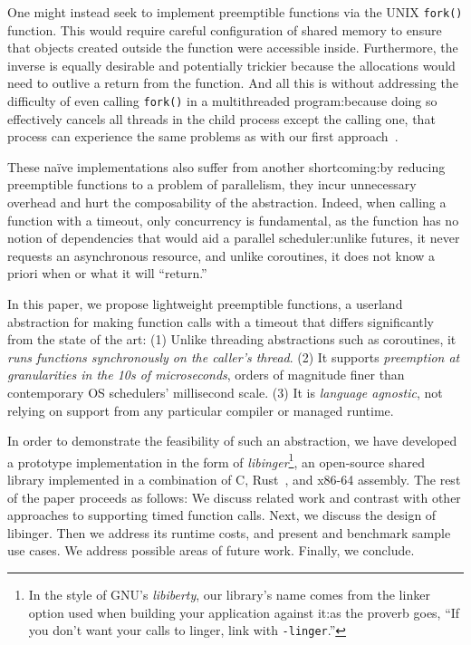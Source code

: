 One might instead seek to implement preemptible functions via the UNIX
\texttt{fork()} function.  This would require careful configuration of shared memory
to ensure that objects created outside the function were accessible inside.
Furthermore, the inverse is equally desirable and potentially trickier because the
allocations would need to outlive a return from the function.  And all this is
without addressing the difficulty of even calling \texttt{fork()} in a multithreaded
program:\@ because doing so effectively cancels all threads in the child process
except the calling one, that process can experience the same problems as with our
first approach~\cite{baumann:hotos2019}.

These na\"ive implementations also suffer from another shortcoming:\@ by reducing
preemptible functions to a problem of parallelism, they incur unnecessary overhead
and hurt the composability of the abstraction.  Indeed, when calling a function with
a timeout, only concurrency is fundamental, as the function has no notion of
dependencies that would aid a parallel scheduler:\@ unlike futures, it never requests
an asynchronous resource, and unlike coroutines, it does not know a priori when or
what it will ``return.''

In this paper, we propose lightweight preemptible functions, a userland abstraction
for making function calls with a timeout that differs significantly from the state of
the art:  (1) Unlike threading abstractions such as coroutines, it \textit{runs
functions synchronously on the caller's thread}.  (2) It supports \textit{preemption
at granularities in the 10s of microseconds}, orders of magnitude finer than
contemporary OS schedulers' millisecond scale.  (3) It is \textit{language agnostic},
not relying on support from any particular compiler or managed runtime.

In order to demonstrate the feasibility of such an abstraction, we have developed a
prototype implementation in the form of \textit{libinger}\footnote{In the style of
GNU's \textit{libiberty}, our library's name comes from the linker option used when
building your application against it:\@ as the proverb goes, ``If you don't want your
calls to linger, link with \texttt{-linger}.''}, an open-source shared library
implemented in a combination of C, Rust~\cite{www-rustlang}, and x86-64 assembly.
The rest of the paper proceeds as follows:  We discuss related work and contrast with
other approaches to supporting timed function calls.  Next, we discuss the design of
libinger.  Then we address its runtime costs, and present and benchmark sample use
cases.  We address possible areas of future work.  Finally, we conclude.
